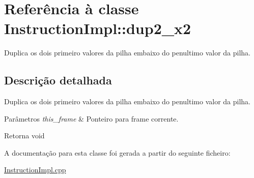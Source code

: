 \hypertarget{class_instruction_impl_1_1dup2__x2}{}\section{Referência à classe Instruction\+Impl\+:\+:dup2\+\_\+x2}
\label{class_instruction_impl_1_1dup2__x2}


Duplica os dois primeiro valores da pilha embaixo do penultimo valor da pilha.  




\subsection{Descrição detalhada}
Duplica os dois primeiro valores da pilha embaixo do penultimo valor da pilha. 


\begin{DoxyParams}{Parâmetros}
{\em this\+\_\+frame} & Ponteiro para frame corrente. \\
\hline
\end{DoxyParams}
\begin{DoxyReturn}{Retorna}
void 
\end{DoxyReturn}


A documentação para esta classe foi gerada a partir do seguinte ficheiro\+:\begin{DoxyCompactItemize}
\item 
\hyperlink{_instruction_impl_8cpp}{Instruction\+Impl.\+cpp}\end{DoxyCompactItemize}
